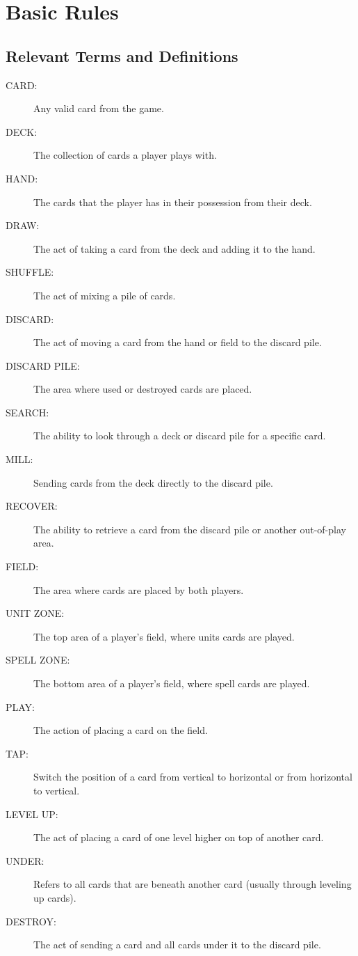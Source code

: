 \chapter{Basic Rules}

\section{Relevant Terms and Definitions}
\begin{description}
    \item[CARD:] Any valid card from the game.
    \item[DECK:] The collection of cards a player plays with.
    \item[HAND:] The cards that the player has in their possession from their deck.
    \item[DRAW:] The act of taking a card from the deck and adding it to the hand.
    \item[SHUFFLE:] The act of mixing a pile of cards.
    \item[DISCARD:] The act of moving a card from the hand or field to the discard pile.
    \item[DISCARD PILE:] The area where used or destroyed cards are placed.
    \item[SEARCH:] The ability to look through a deck or discard pile for a specific card.
    \item[MILL:] Sending cards from the deck directly to the discard pile.
    \item[RECOVER:] The ability to retrieve a card from the discard pile or another out-of-play area.
    \item[FIELD:] The area where cards are placed by both players.
    \item[UNIT ZONE:] The top area of a player's field, where units cards are played.
    \item[SPELL ZONE:] The bottom area of a player's field, where spell cards are played.
    \item[PLAY:] The action of placing a card on the field.
    \item[TAP:] Switch the position of a card from vertical to horizontal or from horizontal to vertical.
    \item[LEVEL UP:] The act of placing a card of one level higher on top of another card.
    \item[UNDER:] Refers to all cards that are beneath another card (usually through leveling up cards).
    \item[DESTROY:] The act of sending a card and all cards under it to the discard pile.

\end{description}
